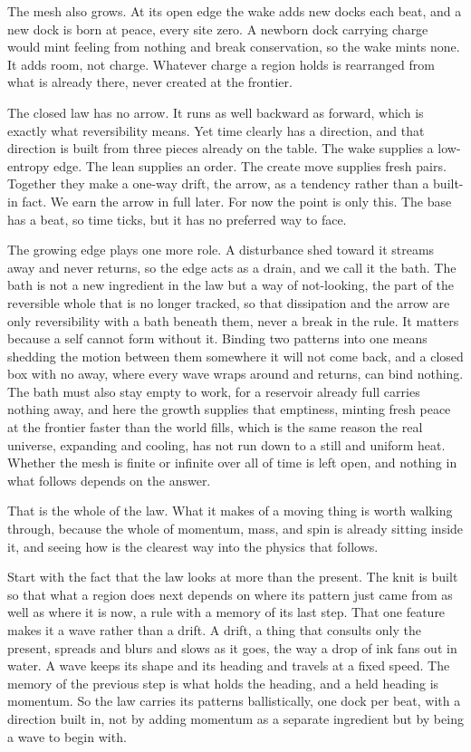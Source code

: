 The mesh also grows. At its open edge the wake adds new docks each beat, and a new dock is born at peace, every site zero. A newborn dock carrying charge would mint feeling from nothing and break conservation, so the wake mints none. It adds room, not charge. Whatever charge a region holds is rearranged from what is already there, never created at the frontier.

The closed law has no arrow. It runs as well backward as forward, which is exactly what reversibility means. Yet time clearly has a direction, and that direction is built from three pieces already on the table. The wake supplies a low-entropy edge. The lean supplies an order. The create move supplies fresh pairs. Together they make a one-way drift, the arrow, as a tendency rather than a built-in fact. We earn the arrow in full later. For now the point is only this. The base has a beat, so time ticks, but it has no preferred way to face.

The growing edge plays one more role. A disturbance shed toward it streams away and never returns, so the edge acts as a drain, and we call it the bath. The bath is not a new ingredient in the law but a way of not-looking, the part of the reversible whole that is no longer tracked, so that dissipation and the arrow are only reversibility with a bath beneath them, never a break in the rule. It matters because a self cannot form without it. Binding two patterns into one means shedding the motion between them somewhere it will not come back, and a closed box with no away, where every wave wraps around and returns, can bind nothing. The bath must also stay empty to work, for a reservoir already full carries nothing away, and here the growth supplies that emptiness, minting fresh peace at the frontier faster than the world fills, which is the same reason the real universe, expanding and cooling, has not run down to a still and uniform heat. Whether the mesh is finite or infinite over all of time is left open, and nothing in what follows depends on the answer.

That is the whole of the law. What it makes of a moving thing is worth walking through, because the whole of momentum, mass, and spin is already sitting inside it, and seeing how is the clearest way into the physics that follows.

Start with the fact that the law looks at more than the present. The knit is built so that what a region does next depends on where its pattern just came from as well as where it is now, a rule with a memory of its last step. That one feature makes it a wave rather than a drift. A drift, a thing that consults only the present, spreads and blurs and slows as it goes, the way a drop of ink fans out in water. A wave keeps its shape and its heading and travels at a fixed speed. The memory of the previous step is what holds the heading, and a held heading is momentum. So the law carries its patterns ballistically, one dock per beat, with a direction built in, not by adding momentum as a separate ingredient but by being a wave to begin with.

